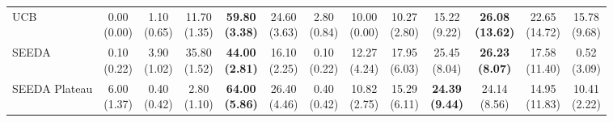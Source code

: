 \begin{table}[H]
{\begin{tabular}{l|cccccc|cccccc}
UCB & \makecell{0.00 \\ (0.00)} & \makecell{1.10 \\ (0.65)} & {\cellcolor[HTML]{C8E6C9}} \makecell{11.70 \\ (1.35)} & \bfseries \makecell{59.80 \\ (3.38)} & \makecell{24.60 \\ (3.63)} & \makecell{2.80 \\ (0.84)} & \makecell{10.00 \\ (0.00)} & \makecell{10.27 \\ (2.80)} & {\cellcolor[HTML]{C8E6C9}} \makecell{15.22 \\ (9.22)} & \bfseries \makecell{26.08 \\ (13.62)} & \makecell{22.65 \\ (14.72)} & \makecell{15.78 \\ (9.68)} \\
SEEDA & \makecell{0.10 \\ (0.22)} & \makecell{3.90 \\ (1.02)} & {\cellcolor[HTML]{C8E6C9}} \makecell{35.80 \\ (1.52)} & \bfseries \makecell{44.00 \\ (2.81)} & \makecell{16.10 \\ (2.25)} & \makecell{0.10 \\ (0.22)} & \makecell{12.27 \\ (4.24)} & \makecell{17.95 \\ (6.03)} & {\cellcolor[HTML]{C8E6C9}} \makecell{25.45 \\ (8.04)} & \bfseries \makecell{26.23 \\ (8.07)} & \makecell{17.58 \\ (11.40)} & \makecell{0.52 \\ (3.09)} \\
SEEDA Plateau & \makecell{6.00 \\ (1.37)} & \makecell{0.40 \\ (0.42)} & {\cellcolor[HTML]{C8E6C9}} \makecell{2.80 \\ (1.10)} & \bfseries \makecell{64.00 \\ (5.86)} & \makecell{26.40 \\ (4.46)} & \makecell{0.40 \\ (0.42)} & \makecell{10.82 \\ (2.75)} & \makecell{15.29 \\ (6.11)} & {\cellcolor[HTML]{C8E6C9}} \bfseries \makecell{24.39 \\ (9.44)} & \makecell{24.14 \\ (8.56)} & \makecell{14.95 \\ (11.83)} & \makecell{10.41 \\ (2.22)} \\
\bottomrule
\end{tabular}
}%
\end{table}

